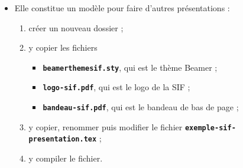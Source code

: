   \begin{itemize}
  \item Elle constitue un modèle pour faire d'autres présentations :
    
    \begin{enumerate}
    \item créer un nouveau dossier ;
    \item y copier les fichiers 

      \begin{itemize}
      \item \texttt{\textbf{beamerthemesif.sty}}, qui est le thème Beamer ;
      \item \texttt{\textbf{logo-sif.pdf}}, qui est le logo de la SIF ;
      \item \texttt{\textbf{bandeau-sif.pdf}}, qui est le bandeau de bas de page ;
      \end{itemize}

    \item y copier, renommer puis modifier le fichier \texttt{\textbf{exemple-sif-presentation.tex}} ;
    \item y compiler le fichier.
    \end{enumerate}
  \end{itemize}
